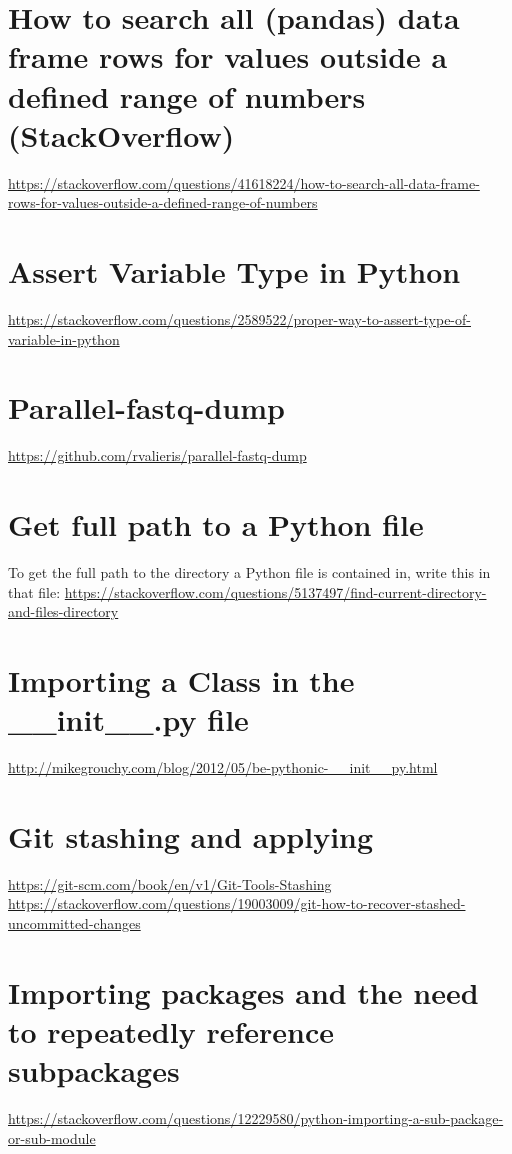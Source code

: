 \begin{fullpage}
\section{How to search all (pandas) data frame rows for values outside a defined range of numbers (StackOverflow)
}
\footnotesize \url{https://stackoverflow.com/questions/41618224/how-to-search-all-data-frame-rows-for-values-outside-a-defined-range-of-numbers}


\section{Assert Variable Type in Python}
\url{https://stackoverflow.com/questions/2589522/proper-way-to-assert-type-of-variable-in-python}


\section{Parallel-fastq-dump}
\url{https://github.com/rvalieris/parallel-fastq-dump}
    
\section{Get full path to a Python file}
To get the full path to the directory a Python file is contained in, write this in that file:
\url{https://stackoverflow.com/questions/5137497/find-current-directory-and-files-directory}

\section{Importing a Class in the \_\_init\_\_.py file}
\url{http://mikegrouchy.com/blog/2012/05/be-pythonic-__init__py.html}

\section{Git stashing and applying}
\url{https://git-scm.com/book/en/v1/Git-Tools-Stashing} \newline
\url{https://stackoverflow.com/questions/19003009/git-how-to-recover-stashed-uncommitted-changes}

\section{Importing packages and the need to repeatedly reference subpackages}
\url{https://stackoverflow.com/questions/12229580/python-importing-a-sub-package-or-sub-module}


\end{fullpage}
